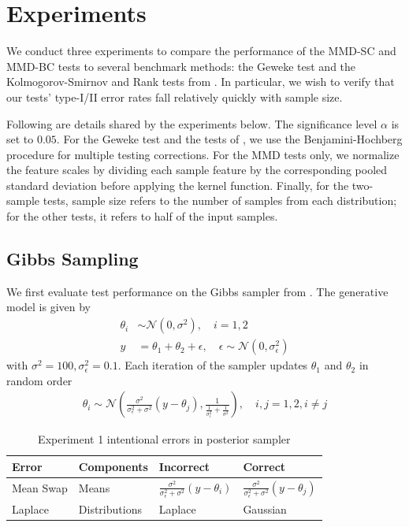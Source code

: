 \documentclass{article}
\begin{document}
\section{Experiments}\label{sec:experiments}
We conduct three experiments to compare the performance of the MMD-SC and MMD-BC tests to several benchmark methods: the Geweke test and the Kolmogorov-Smirnov and Rank tests from \cite{gandy_unit_2020}. 
In particular, we wish to verify that our tests' type-I/II error rates fall relatively quickly with sample size. 

Following are details shared by the experiments below.
The significance level $\alpha$ is set to $0.05.$
For the Geweke test and the tests of \cite{gandy_unit_2020}, 
we use the Benjamini-Hochberg procedure \citep{benjamini_controlling_1995} for multiple testing corrections. 
For the MMD tests only,
we normalize the feature scales by dividing each sample feature by the corresponding pooled standard deviation before applying the kernel function. 
Finally, for the two-sample tests, sample size refers to the number of samples from each distribution; for the other tests, it refers to half of the input samples.

\subsection{Gibbs Sampling}
We first evaluate test performance on the Gibbs sampler from \cite{gandy_unit_2020}. 
The generative model is given by
\begin{align}
    \theta_i &\sim \mathcal{N}(0, \sigma^2), \quad i=1,2 \\
    y &= \theta_1 + \theta_2 + \epsilon, \quad \epsilon \sim \mathcal{N}(0, \sigma_\epsilon^2)
    \label{eq:ex1}
\end{align}
with  $\sigma^{2}=100, \sigma_{\epsilon}^{2}=0.1$. Each iteration of the sampler updates $\theta_{1}$ and $\theta_{2}$ in random order
\begin{align}
\theta_{i} \sim \mathcal{N}\left(
\frac{\sigma^{2}}{\sigma_{\epsilon}^{2}+\sigma^{2}}\left(y-\theta_{j}\right)
, \frac{1}{\frac{1}{\sigma_{\epsilon}^{2}}+\frac{1}{\sigma^{2}}}\right), \quad i,j=1,2, i \neq j
\end{align}

\begin{table}
    \caption{Experiment 1 intentional errors in posterior sampler}
    \label{tab:ex1_errors}
    \centering
    \begin{tabular}{l|l|l|l}
    \toprule
          Error & Components & Incorrect & Correct \\
    \midrule  
         Mean Swap & Means &  $\frac{\sigma^{2}}{\sigma_{\epsilon}^{2}+\sigma^{2}}\left(y-\theta_{i}\right)$ & $\frac{\sigma^{2}}{\sigma_{\epsilon}^{2}+\sigma^{2}}\left(y-\theta_{j}\right)$\\
         Laplace & Distributions & Laplace & Gaussian \\
    \bottomrule
    \end{tabular}
\end{table}
\end{document}
